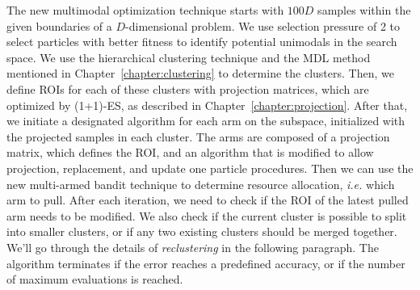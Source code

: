 The new multimodal optimization technique starts with $100D$ samples within the given boundaries of a $D$-dimensional problem.
We use selection pressure of 2 to select particles with better fitness to identify potential unimodals in the search space.
We use the hierarchical clustering technique and the MDL method mentioned in Chapter~\ref{chapter:clustering} to determine the clusters.
Then, we define ROIs for each of these clusters with projection matrices, 
which are optimized by (1+1)-ES, as described in Chapter~\ref{chapter:projection}.
After that, we initiate a designated algorithm for each arm on the subspace, initialized with the projected samples in each cluster.
The arms are composed of a projection matrix, which defines the ROI, 
and an algorithm that is modified to allow projection, replacement, and update one particle procedures.
Then we can use the new multi-armed bandit technique to determine resource allocation, \textit{i.e.} which arm to pull. 
After each iteration, we need to check if the ROI of the latest pulled arm needs to be modified.
We also check if the current cluster is possible to split into smaller clusters, or if any two existing clusters should be merged together.
We'll go through the details of \textit{reclustering} in the following paragraph.
The algorithm terminates if the error reaches a predefined accuracy, or if the number of maximum evaluations is reached.





%
%
%
%
%





